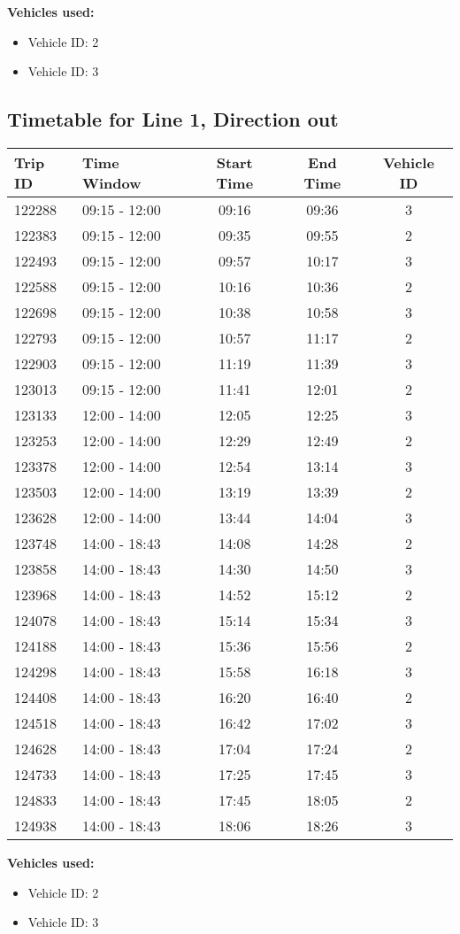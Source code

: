 \documentclass{article}
\begin{document}
\textbf{Vehicles used:}
\begin{itemize}
  \item Vehicle ID: 2
  \item Vehicle ID: 3
\end{itemize}

\subsection*{Timetable for Line 1, Direction out}
\begin{tabular}{llccc}
\toprule
Trip ID & Time Window & Start Time & End Time & Vehicle ID \\
\midrule
122288 & 09:15 - 12:00 & 09:16 & 09:36 & 3 \\
122383 & 09:15 - 12:00 & 09:35 & 09:55 & 2 \\
122493 & 09:15 - 12:00 & 09:57 & 10:17 & 3 \\
122588 & 09:15 - 12:00 & 10:16 & 10:36 & 2 \\
122698 & 09:15 - 12:00 & 10:38 & 10:58 & 3 \\
122793 & 09:15 - 12:00 & 10:57 & 11:17 & 2 \\
122903 & 09:15 - 12:00 & 11:19 & 11:39 & 3 \\
123013 & 09:15 - 12:00 & 11:41 & 12:01 & 2 \\
123133 & 12:00 - 14:00 & 12:05 & 12:25 & 3 \\
123253 & 12:00 - 14:00 & 12:29 & 12:49 & 2 \\
123378 & 12:00 - 14:00 & 12:54 & 13:14 & 3 \\
123503 & 12:00 - 14:00 & 13:19 & 13:39 & 2 \\
123628 & 12:00 - 14:00 & 13:44 & 14:04 & 3 \\
123748 & 14:00 - 18:43 & 14:08 & 14:28 & 2 \\
123858 & 14:00 - 18:43 & 14:30 & 14:50 & 3 \\
123968 & 14:00 - 18:43 & 14:52 & 15:12 & 2 \\
124078 & 14:00 - 18:43 & 15:14 & 15:34 & 3 \\
124188 & 14:00 - 18:43 & 15:36 & 15:56 & 2 \\
124298 & 14:00 - 18:43 & 15:58 & 16:18 & 3 \\
124408 & 14:00 - 18:43 & 16:20 & 16:40 & 2 \\
124518 & 14:00 - 18:43 & 16:42 & 17:02 & 3 \\
124628 & 14:00 - 18:43 & 17:04 & 17:24 & 2 \\
124733 & 14:00 - 18:43 & 17:25 & 17:45 & 3 \\
124833 & 14:00 - 18:43 & 17:45 & 18:05 & 2 \\
124938 & 14:00 - 18:43 & 18:06 & 18:26 & 3 \\
\bottomrule
\end{tabular}

\textbf{Vehicles used:}
\begin{itemize}
  \item Vehicle ID: 2
  \item Vehicle ID: 3
\end{itemize}
\end{document}
